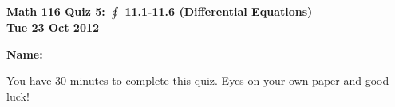 \documentclass[11pt,letterpaper]{article}
\begin{document}
\flushleft
\begin{multicols}{2}

\begin{large}\textbf{Math 116 Quiz 5: $\oint$ 11.1-11.6 (Differential Equations) \\
Tue 23 Oct 2012}\end{large}

\textbf{Name:  }\underline{\hspace{35ex}}

\vspace{.5in}

\end{multicols}

\pagestyle{empty}


\flushleft

You have 30 minutes to complete this quiz.  Eyes on your own paper and good luck!
\end{document}
